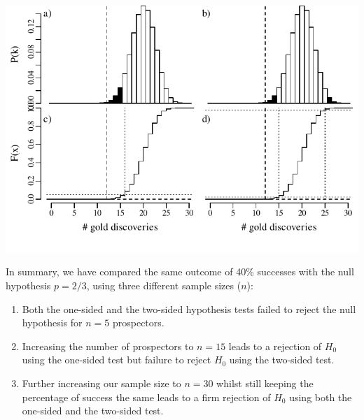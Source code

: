 \noindent\begin{minipage}[t][][b]{.65\textwidth}
  \includegraphics[width=\textwidth]{../figures/binomialrejection30.pdf}
\end{minipage}
\begin{minipage}[t][][t]{.35\textwidth}
  \label{fig:binomialrejection30}
\end{minipage}

In summary, we have compared the same outcome of 40\% successes with
the null hypothesis $p=2/3$, using three different sample sizes ($n$):

\begin{enumerate}
  \item Both the one-sided and the two-sided hypothesis tests failed
    to reject the null hypothesis for $n=5$ prospectors.
  \item Increasing the number of prospectors to $n=15$ leads to a
    rejection of $H_0$ using the one-sided test but failure to reject
    $H_0$ using the two-sided test.
  \item Further increasing our sample size to $n=30$ whilst still
    keeping the percentage of success the same leads to a firm
    rejection of $H_0$ using both the one-sided and the two-sided
    test.
\end{enumerate}

